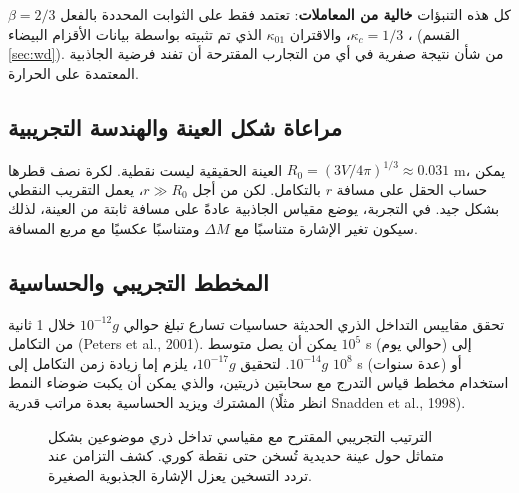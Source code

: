 \documentclass[11pt,a4paper]{article}
\begin{document}
	كل هذه التنبؤات \textbf{خالية من المعاملات}: تعتمد فقط على الثوابت المحددة بالفعل $\beta = 2/3$، $\kappa_c = 1/3$، والاقتران $\kappa_{01}$ الذي تم تثبيته بواسطة بيانات الأقزام البيضاء (القسم \ref{sec:wd}). من شأن نتيجة صفرية في أي من التجارب المقترحة أن تفند فرضية الجاذبية المعتمدة على الحرارة.
	
	\subsection{مراعاة شكل العينة والهندسة التجريبية}
	\label{subsec:lab-geometry}
	
	العينة الحقيقية ليست نقطية. لكرة نصف قطرها $R_0 = (3V/4\pi)^{1/3} \approx 0.031$ m، يمكن حساب الحقل على مسافة $r$ بالتكامل. لكن من أجل $r \gg R_0$، يعمل التقريب النقطي بشكل جيد. في التجربة، يوضع مقياس الجاذبية عادةً على مسافة ثابتة من العينة، لذلك سيكون تغير الإشارة متناسبًا مع $\Delta M$ ومتناسبًا عكسيًا مع مربع المسافة.
	
	\subsection{المخطط التجريبي والحساسية}
	\label{subsec:lab-scheme}
	
	تحقق مقاييس التداخل الذري الحديثة حساسيات تسارع تبلغ حوالي $10^{-12}g$ خلال 1 ثانية من التكامل (Peters et al., 2001). يمكن أن يصل متوسط $10^5$ s (حوالي يوم) إلى $10^{-14}g$. لتحقيق $10^{-17}g$، يلزم إما زيادة زمن التكامل إلى $10^8$ s (عدة سنوات) أو استخدام مخطط قياس التدرج مع سحابتين ذريتين، والذي يمكن أن يكبت ضوضاء النمط المشترك ويزيد الحساسية بعدة مراتب قدرية (انظر مثلًا Snadden et al., 1998).
	
	\begin{figure}[htbp]
		\centering
		\caption{الترتيب التجريبي المقترح مع مقياسي تداخل ذري موضوعين بشكل متماثل حول عينة حديدية تُسخن حتى نقطة كوري. كشف التزامن عند تردد التسخين يعزل الإشارة الجذبوية الصغيرة.}
		\label{fig:lab-setup}
	\end{figure}
	
\end{document}
